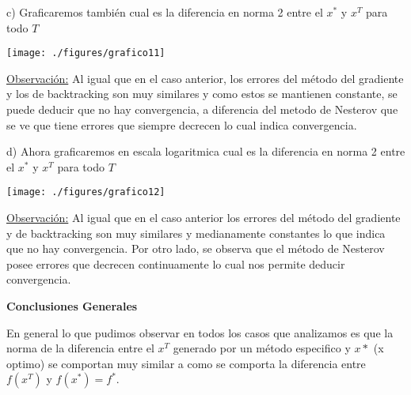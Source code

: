 \documentclass[11pt]{article}
\begin{document}
c) Graficaremos también cual es la diferencia en norma 2 entre el $x^{*}$ y $x^T$ para todo $T$ \\

\begin{center}
\texttt{[image: ./figures/grafico11]}
\end{center}

\underline{Observación:} Al igual que en el caso anterior, los errores del método del gradiente y los de backtracking son muy similares y como estos se mantienen constante, se puede deducir que no hay convergencia, a diferencia del metodo de Nesterov que se ve que tiene errores que siempre decrecen lo cual indica convergencia. \\

\newpage

d) Ahora graficaremos en escala logaritmica cual es la diferencia en norma 2 entre el $x^{*}$ y $x^T$ para todo $T$ \\

\begin{center}
\texttt{[image: ./figures/grafico12]}
\end{center}

\underline{Observación:} Al igual que en el caso anterior los errores del método del gradiente y de backtracking son muy similares y medianamente constantes lo que indica que no hay convergencia. Por otro lado, se observa que el método de Nesterov posee errores que decrecen continuamente lo cual nos permite deducir convergencia. \\

\begin{center}
\textbf{Conclusiones Generales}
\end{center}

En general lo que pudimos observar en todos los casos que analizamos es que la norma de la diferencia entre el $x^T$ generado por un método especifico y $x*$ (x optimo) se comportan muy similar a como se comporta la diferencia entre $f(x^T)$ y $ f(x^*) = f^*$. \\
\end{document}
